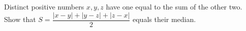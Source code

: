 Distinct positive numbers $x,y,z$ have one equal to the sum of the other two. Show that $S=\dfrac{|x-y|+|y-z|+|z-x|}{2}$ equals their median.
